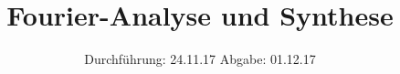 

\subject{V351}
\title{Fourier-Analyse und Synthese}
\date{%
  Durchführung: 24.11.17
  \hspace{3em}
  Abgabe: 01.12.17
}



\maketitle
\thispagestyle{empty}
\tableofcontents
\newpage






\printbibliography{}


